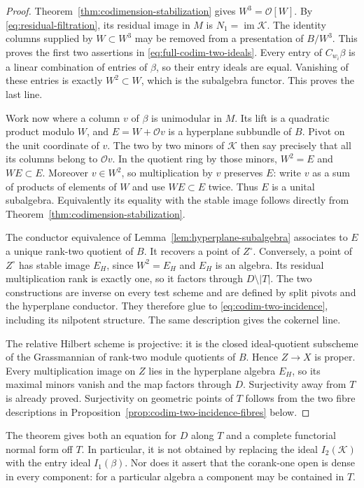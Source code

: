 \begin{proof}
Theorem~\ref{thm:codimension-stabilization} gives $W^3=\mathcal O[W]$.
By \eqref{eq:residual-filtration}, its residual image in $M$ is
$N_1=\operatorname{im}\mathcal K$. The identity columns supplied by
$W\subset W^3$ may be removed from a presentation of $B/W^3$.
This proves the first two assertions in
\eqref{eq:full-codim-two-ideals}. Every entry of $C_{w_i}\beta$ is
a linear combination of entries of $\beta$, so their entry ideals
are equal. Vanishing of these entries is exactly $W^2\subset W$,
which is the subalgebra functor. This proves the last line.

Work now where a column $v$ of $\beta$ is unimodular in $M$.
Its lift is a quadratic product modulo $W$, and
$E=W+\mathcal O v$ is a hyperplane subbundle of $B$. Pivot on the
unit coordinate of $v$. The two by two minors of $\mathcal K$
then say precisely that all its columns belong to $\mathcal O v$.
In the quotient ring by those minors, $W^2=E$ and $WE\subset E$.
Moreover $v\in W^2$, so multiplication by $v$ preserves $E$:
write $v$ as a sum of products of elements of $W$ and use $WE\subset E$
twice. Thus $E$ is a unital subalgebra. Equivalently its equality
with the stable image follows directly from
Theorem~\ref{thm:codimension-stabilization}.

The conductor equivalence of Lemma~\ref{lem:hyperplane-subalgebra}
associates to $E$ a unique rank-two quotient of $B$. It recovers a
point of $Z^\circ$. Conversely, a point of $Z^\circ$ has stable
image $E_H$, since $W^2=E_H$ and $E_H$ is an algebra. Its residual
multiplication rank is exactly one, so it factors through
$D\setminus|T|$. The two constructions are inverse on every test
scheme and are defined by split pivots and the hyperplane conductor.
They therefore glue to \eqref{eq:codim-two-incidence}, including
its nilpotent structure. The same description gives the cokernel line.

The relative Hilbert scheme is projective: it is the closed
ideal-quotient subscheme of the Grassmannian of rank-two module
quotients of $B$. Hence $Z\to X$ is proper. Every multiplication
image on $Z$ lies in the hyperplane algebra $E_H$, so its maximal
minors vanish and the map factors through $D$. Surjectivity away
from $T$ is already proved. Surjectivity on geometric points of
$T$ follows from the two fibre descriptions in
Proposition~\ref{prop:codim-two-incidence-fibres} below.
\end{proof}

The theorem gives both an equation for $D$ along $T$ and a complete
functorial normal form off $T$. In particular, it is not obtained
by replacing the ideal $I_2(\mathcal K)$ with the entry ideal
$I_1(\beta)$. Nor does it assert that the corank-one open is dense
in every component: for a particular algebra a component may be
contained in $T$.

